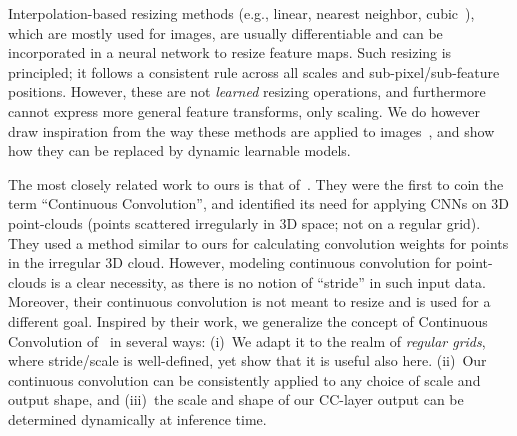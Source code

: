 Interpolation-based resizing methods (e.g., linear, nearest neighbor, cubic~\cite{keys1981cubic}), which are mostly used for images, are usually differentiable and can be incorporated in a neural network to resize feature maps. Such resizing is principled; it follows a consistent rule across all scales and sub-pixel/sub-feature positions. 
However, these are not \emph{learned} resizing operations, and furthermore cannot express more general feature transforms, only scaling. We do however draw inspiration from the way these methods are applied to images~\cite{MATLAB:2010}, 
and show how 
they can be replaced by dynamic learnable models.
%




The most closely related work to ours is that of~\cite{wang2018deep}. 
They were the first to coin the term ``Continuous Convolution'', and identified its need for applying CNNs on 3D point-clouds (points scattered irregularly in 3D space; not on a regular grid).  
They used a method similar to ours for calculating convolution weights for points in the irregular 3D cloud. However, modeling continuous convolution for point-clouds is 
a clear necessity, as  there is no notion of ``stride'' in such input data. Moreover, their continuous convolution is not meant to resize and is used for a different goal. Inspired by their work, we generalize the concept of Continuous Convolution of~\cite{wang2018deep} in several ways: (i)~We adapt it to the realm of \emph{regular grids}, where stride/scale is well-defined, yet show that it is useful also here. (ii)~Our continuous convolution can be consistently applied to any choice of scale and output shape, and (iii)~the scale and shape of our  CC-layer output can be determined dynamically at inference time.

